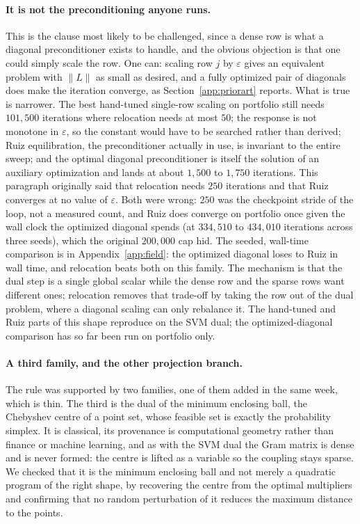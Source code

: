 \documentclass[11pt]{article}
\begin{document}
\paragraph{It is not the preconditioning anyone runs.}
This is the clause most likely to be challenged, since a dense row is what a
diagonal preconditioner exists to handle, and the obvious objection is that
one could simply scale the row. One can: scaling row $j$ by $\varepsilon$
gives an equivalent problem with $\|L\|$ as small as desired, and a fully
optimized pair of diagonals does make the iteration converge, as
Section~\ref{app:priorart} reports. What is true is narrower. The best
hand-tuned single-row scaling on portfolio still needs $101{,}500$ iterations
where relocation needs at most $50$; the response is not monotone in
$\varepsilon$, so the constant would have to be searched rather than derived;
Ruiz equilibration, the preconditioner actually in use, is invariant to the
entire sweep; and the optimal diagonal preconditioner is itself the solution of
an auxiliary optimization and lands at about $1{,}500$ to $1{,}750$ iterations.
This paragraph originally said that relocation needs $250$ iterations and that
Ruiz converges at no value of $\varepsilon$. Both were wrong: $250$ was the
checkpoint stride of the loop, not a measured count, and Ruiz does converge on
portfolio once given the wall clock the optimized diagonal spends (at $334{,}510$
to $434{,}010$ iterations across three seeds), which the original $200{,}000$
cap hid. The seeded, wall-time comparison is in Appendix~\ref{app:field}: the
optimized diagonal loses to Ruiz in wall time, and relocation beats both on this
family. The mechanism is that the dual step is a single global
scalar while the dense row and the sparse rows want different ones;
relocation removes that trade-off by taking the row out of the dual problem,
where a diagonal scaling can only rebalance it. The hand-tuned and Ruiz parts
of this shape reproduce on the SVM dual; the optimized-diagonal comparison has
so far been run on portfolio only.

\paragraph{A third family, and the other projection branch.}
The rule was supported by two families, one of them added in the same week,
which is thin. The third is the dual of the minimum enclosing ball, the
Chebyshev centre of a point set, whose feasible set is exactly the
probability simplex. It is classical, its provenance is computational
geometry rather than finance or machine learning, and as with the SVM dual
the Gram matrix is dense and is never formed: the centre is lifted as a
variable so the coupling stays sparse. We checked that it is the minimum
enclosing ball and not merely a quadratic program of the right shape, by
recovering the centre from the optimal multipliers and confirming that no
random perturbation of it reduces the maximum distance to the points.
\end{document}
